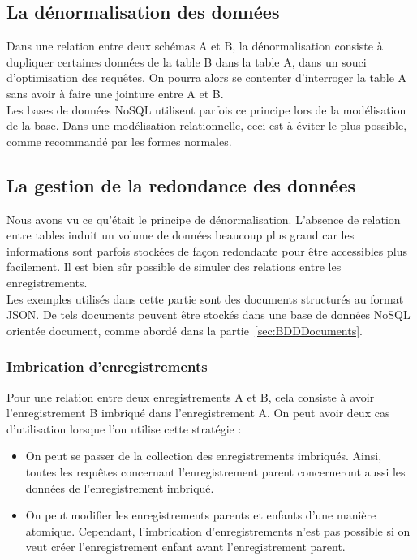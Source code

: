 \subsection{La dénormalisation des données}
	Dans une relation entre deux schémas A et B, la dénormalisation consiste à dupliquer certaines données de la table B dans la table A, dans un souci d'optimisation des requêtes. On pourra alors se contenter d'interroger la table A sans avoir à faire une jointure entre A et B.\\

	Les bases de données NoSQL utilisent parfois ce principe lors de la modélisation de la base. Dans une modélisation relationnelle, ceci est à éviter le plus possible, comme recommandé par les formes normales.

\subsection{La gestion de la redondance des données}
	Nous avons vu ce qu'était le principe de dénormalisation. L'absence de relation entre tables induit un volume de données beaucoup plus grand car les informations sont parfois stockées de façon redondante pour être accessibles plus facilement. Il est bien sûr possible de simuler des relations entre les enregistrements.\\

	Les exemples utilisés dans cette partie sont des documents structurés au format JSON. De tels documents peuvent être stockés dans une base de données NoSQL orientée document, comme abordé dans la partie~\ref{sec:BDDDocuments}.

	\subsubsection{Imbrication d'enregistrements}
		Pour une relation entre deux enregistrements A et B, cela consiste à avoir l'enregistrement B imbriqué dans l'enregistrement A. On peut avoir deux cas d'utilisation lorsque l'on utilise cette stratégie :

		\begin{itemize}
			\item On peut se passer de la collection des enregistrements imbriqués. Ainsi, toutes les requêtes concernant l'enregistrement parent concerneront aussi les données de l'enregistrement imbriqué.
			\item On peut modifier les enregistrements parents et enfants d'une manière atomique. Cependant, l'imbrication d'enregistrements n'est pas possible si on veut créer l'enregistrement enfant avant l'enregistrement parent.
		\end{itemize}
		\vspace{20px}

